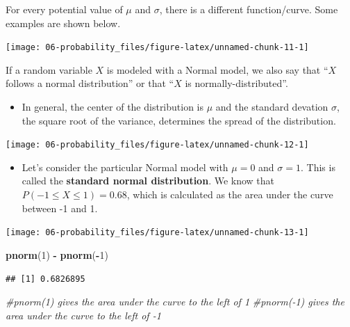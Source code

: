 \documentclass[
]{book}
\newenvironment{Shaded}{\begin{snugshade}}{\end{snugshade}}
\newcommand{\CommentTok}[1]{\textcolor[rgb]{0.56,0.35,0.01}{\textit{#1}}}
\newcommand{\DecValTok}[1]{\textcolor[rgb]{0.00,0.00,0.81}{#1}}
\newcommand{\KeywordTok}[1]{\textcolor[rgb]{0.13,0.29,0.53}{\textbf{#1}}}
\newcommand{\NormalTok}[1]{#1}
\newcommand{\OperatorTok}[1]{\textcolor[rgb]{0.81,0.36,0.00}{\textbf{#1}}}
\newcommand{\StringTok}[1]{\textcolor[rgb]{0.31,0.60,0.02}{#1}}
\providecommand{\tightlist}{%
  \setlength{\itemsep}{0pt}\setlength{\parskip}{0pt}}
\begin{document}
For every potential value of \(\mu\) and \(\sigma\), there is a different function/curve. Some examples are shown below.

\begin{center}\texttt{[image: 06-probability\_files/figure-latex/unnamed-chunk-11-1]} \end{center}

If a random variable \(X\) is modeled with a Normal model, we also say that ``\(X\) follows a normal distribution'' or that ``\(X\) is normally-distributed''.

\begin{itemize}
\tightlist
\item
  In general, the center of the distribution is \(\mu\) and the standard devation \(\sigma\), the square root of the variance, determines the spread of the distribution.
\end{itemize}

\begin{center}\texttt{[image: 06-probability\_files/figure-latex/unnamed-chunk-12-1]} \end{center}

\begin{itemize}
\tightlist
\item
  Let's consider the particular Normal model with \(\mu=0\) and \(\sigma=1\). This is called the \textbf{standard normal distribution}. We know that \(P(-1\leq X \leq 1) = 0.68\), which is calculated as the area under the curve between -1 and 1.
\end{itemize}

\begin{center}\texttt{[image: 06-probability\_files/figure-latex/unnamed-chunk-13-1]} \end{center}

\begin{Shaded}
\begin{Highlighting}[]
\KeywordTok{pnorm}\NormalTok{(}\DecValTok{1}\NormalTok{) }\OperatorTok{-}\StringTok{ }\KeywordTok{pnorm}\NormalTok{(}\OperatorTok{-}\DecValTok{1}\NormalTok{) }
\end{Highlighting}
\end{Shaded}

\begin{verbatim}
## [1] 0.6826895
\end{verbatim}

\begin{Shaded}
\begin{Highlighting}[]
\CommentTok{#pnorm(1) gives the area under the curve to the left of 1}
\CommentTok{#pnorm(-1) gives the area under the curve to the left of -1}
\end{Highlighting}
\end{Shaded}
\end{document}
